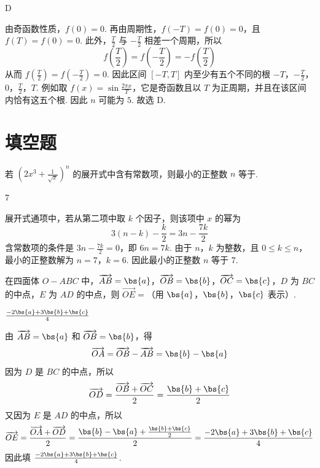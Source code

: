 \begin{answer}
D
\end{answer}

\begin{solution}
由奇函数性质，\(f(0)=0\). 再由周期性，\(f(-T)=f(0)=0\)，且 \(f(T)=f(0)=0\). 此外，\(\frac{T}{2}\) 与 \(-\frac{T}{2}\) 相差一个周期，所以
\[
f\left(\frac{T}{2}\right)=f\left(-\frac{T}{2}\right)=-f\left(\frac{T}{2}\right)
\]
从而 \(f(\frac{T}{2})=f(-\frac{T}{2})=0\). 因此区间 \([-T,T]\) 内至少有五个不同的根 \(-T\)，\(-\frac{T}{2}\)，\(0\)，\(\frac{T}{2}\)，\(T\). 例如取 \(f(x)=\sin\frac{2\pi x}{T}\)，它是奇函数且以 \(T\) 为正周期，并且在该区间内恰有这五个根. 因此 \(n\) 可能为 \(5\). 故选 D.
\end{solution}

\section{填空题}

\begin{problem}
若 \(\left(2x^{3} + \frac{1}{\sqrt{x}}\right)^{n}\) 的展开式中含有常数项，则最小的正整数 \(n\) 等于\fillinblank{}.
\end{problem}

\begin{answer}
7
\end{answer}

\begin{solution}
展开式通项中，若从第二项中取 \(k\) 个因子，则该项中 \(x\) 的幂为
\[
3(n-k)-\frac{k}{2}=3n-\frac{7k}{2}
\]
含常数项的条件是 \(3n-\frac{7k}{2}=0\)，即 \(6n=7k\). 由于 \(n\)，\(k\) 为整数，且 \(0\leqslant k\leqslant n\)，最小的正整数解为 \(n=7\)，\(k=6\). 因此最小的正整数 \(n\) 等于 \(7\).
\end{solution}

\begin{problem}
在四面体 \(O - ABC\) 中，\(\overrightarrow{AB} = \bs{a}\)，\(\overrightarrow{OB} = \bs{b}\)，\(\overrightarrow{OC} = \bs{c}\)，\(D\) 为 \(BC\) 的中点，\(E\) 为 \(AD\) 的中点，则 \(\overrightarrow{OE} =\)\fillinblank{}（用 \(\bs{a}\)，\(\bs{b}\)，\(\bs{c}\) 表示）.
\end{problem}

\begin{answer}
\(\frac{-2\bs{a}+3\bs{b}+\bs{c}}{4}\)
\end{answer}

\begin{solution}
由 \(\overrightarrow{AB}=\bs{a}\) 和 \(\overrightarrow{OB}=\bs{b}\)，得
\[
\overrightarrow{OA}=\overrightarrow{OB}-\overrightarrow{AB}=\bs{b}-\bs{a}
\]
因为 \(D\) 是 \(BC\) 的中点，所以
\[
\overrightarrow{OD}=\frac{\overrightarrow{OB}+\overrightarrow{OC}}{2}
=\frac{\bs{b}+\bs{c}}{2}
\]
又因为 \(E\) 是 \(AD\) 的中点，所以
\[
\overrightarrow{OE}
=\frac{\overrightarrow{OA}+\overrightarrow{OD}}{2}
=\frac{\bs{b}-\bs{a}+\frac{\bs{b}+\bs{c}}{2}}{2}
=\frac{-2\bs{a}+3\bs{b}+\bs{c}}{4}
\]
因此填 \(\frac{-2\bs{a}+3\bs{b}+\bs{c}}{4}\).
\end{solution}

